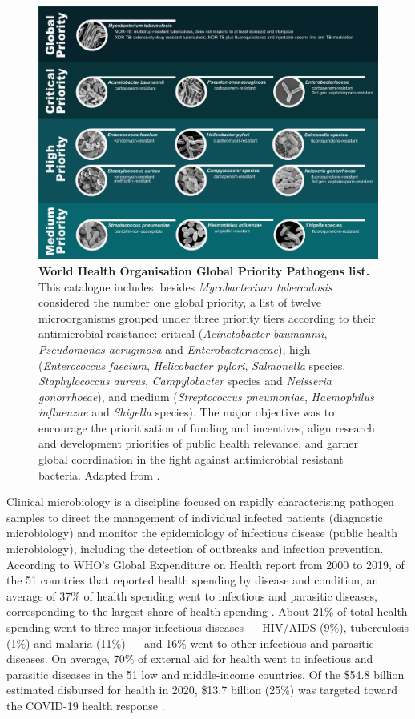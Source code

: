 \begin{figure}[h!]
\centering
\includegraphics[width=\textwidth]{figures/introduction/Figure 1.png}
\caption{\textbf{World Health Organisation Global Priority Pathogens list.} This catalogue includes, besides \textit{Mycobacterium tuberculosis} considered the number one global priority, a list of twelve microorganisms grouped under three priority tiers according to their antimicrobial resistance: critical (\textit{Acinetobacter baumannii}, \textit{Pseudomonas aeruginosa} and \textit{Enterobacteriaceae}), high (\textit{Enterococcus faecium}, \textit{Helicobacter pylori}, \textit{Salmonella} species, \textit{Staphylococcus aureus}, \textit{Campylobacter} species and \textit{Neisseria gonorrhoeae}), and medium (\textit{Streptococcus pneumoniae}, \textit{Haemophilus influenzae} and \textit{Shigella} species). The major objective was to encourage the prioritisation of funding and incentives, align research and development priorities of public health relevance, and garner global coordination in the fight against antimicrobial resistant bacteria. Adapted from \cite{world_health_organization_prioritization_2017}.}
\label{fig:figure1}
\end{figure}

Clinical microbiology is a discipline focused on rapidly characterising pathogen samples to direct the management of individual infected patients (diagnostic microbiology) and monitor the epidemiology of infectious disease (public health microbiology), including the detection of outbreaks and infection prevention. 
According to WHO's Global Expenditure on Health report from 2000 to 2019, of the 51 countries that reported health spending by disease and condition, an average of 37\% of health spending went to infectious and parasitic diseases, corresponding to the largest share of health spending \citep{world_health_organization_global_2021}. 
About 21\% of total health spending went to three major infectious diseases — HIV/AIDS (9\%), tuberculosis (1\%) and malaria (11\%) — and 16\% went to other infectious and parasitic diseases. 
On average, 70\% of external aid for health went to infectious and parasitic diseases in the 51 low and middle-income countries. 
Of the \$54.8 billion estimated disbursed for health in 2020, \$13.7 billion (25\%) was targeted toward the COVID-19 health response \citep{micah_tracking_2021}.

